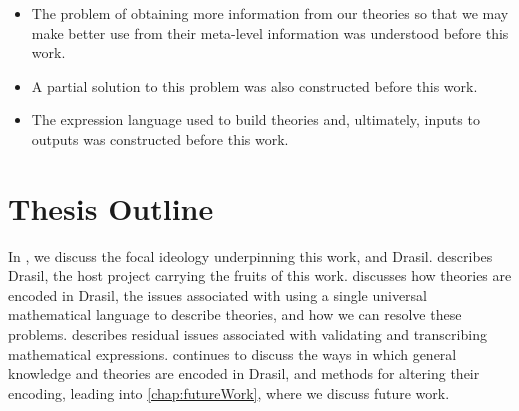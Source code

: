 \begin{itemize}
      \item The problem of obtaining more information from our theories so that
            we may make better use from their meta-level information was
            understood before this work.
      \item A partial solution to this problem was also constructed before this
            work.
      \item The expression language used to build theories and, ultimately,
            inputs to outputs was constructed before this work.
\end{itemize}

\section{Thesis Outline}
\label{sec:intro:outline}

In , we discuss the focal ideology underpinning this work,
and Drasil.  describes Drasil, the host project carrying the
fruits of this work.  discusses how theories are encoded
in Drasil, the issues associated with using a single universal mathematical
language to describe theories, and how we can resolve these problems.
 describes residual issues associated with validating and
transcribing mathematical expressions.  continues to
discuss the ways in which general knowledge and theories are encoded in Drasil,
and methods for altering their encoding, leading into \cref{chap:futureWork},
where we discuss future work.
